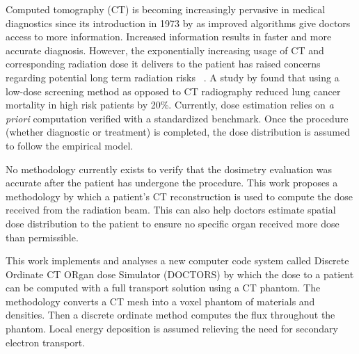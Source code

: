 

Computed tomography (CT) is becoming increasingly pervasive in medical diagnostics since its introduction in 1973 by \citet{ref:hounsfieldg} as improved algorithms give doctors access to more information. Increased information results in faster and more accurate diagnosis. However, the exponentially increasing usage of CT and corresponding radiation dose it delivers to the patient has raised concerns regarding potential long term radiation risks~\citep{ref:brennerd} \citep{ref:einsteina1} \citep{ref:abramsh} \citep{ref:einsteina2} \citep{ref:mccolloughc} \citep{ref:yul}. A study by \citet{ref:kovalchiks} found that using a low-dose screening method as opposed to CT radiography reduced lung cancer mortality in high risk patients by 20\%. Currently, dose estimation relies on \textit{a priori} computation verified with a standardized benchmark. Once the procedure (whether diagnostic or treatment) is completed, the dose distribution is assumed to follow the empirical model.

No methodology currently exists to verify that the dosimetry evaluation was accurate after the patient has undergone the procedure. This work proposes a methodology by which a patient's CT reconstruction is used to compute the dose received from the radiation beam. This can also help doctors estimate spatial dose distribution to the patient to ensure no specific organ received more dose than permissible.

This work implements and analyses a new computer code system called Discrete Ordinate CT ORgan dose Simulator (DOCTORS) by which the dose to a patient can be computed with a full transport solution using a CT phantom. The methodology converts a CT mesh into a voxel phantom of materials and densities. Then a discrete ordinate method computes the flux throughout the phantom. Local energy deposition is assumed relieving the need for secondary electron transport.

